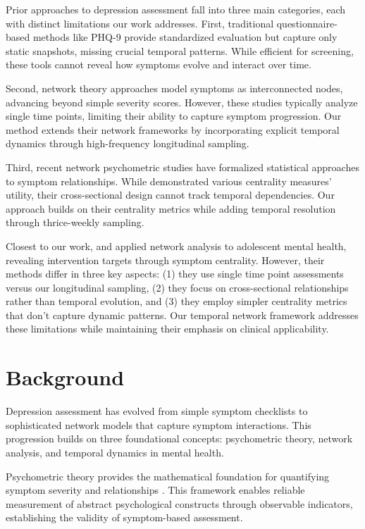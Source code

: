 \documentclass{article} %
\begin{document}
Prior approaches to depression assessment fall into three main categories, each with distinct limitations our work addresses. First, traditional questionnaire-based methods like PHQ-9 \citep{Kroenke2001ThePV} provide standardized evaluation but capture only static snapshots, missing crucial temporal patterns. While efficient for screening, these tools cannot reveal how symptoms evolve and interact over time.

Second, network theory approaches \citep{Fried2016MentalDA, Robinaugh2019TheNA} model symptoms as interconnected nodes, advancing beyond simple severity scores. However, these studies typically analyze single time points, limiting their ability to capture symptom progression. Our method extends their network frameworks by incorporating explicit temporal dynamics through high-frequency longitudinal sampling.

Third, recent network psychometric studies \citep{Marsman2018AnIT} have formalized statistical approaches to symptom relationships. While \citet{Contreras2019TheSO} demonstrated various centrality measures' utility, their cross-sectional design cannot track temporal dependencies. Our approach builds on their centrality metrics while adding temporal resolution through thrice-weekly sampling.

Closest to our work, \citet{Ruan2022ANA} and \citet{Pereira-Morales2019NetworkAO} applied network analysis to adolescent mental health, revealing intervention targets through symptom centrality. However, their methods differ in three key aspects: (1) they use single time point assessments versus our longitudinal sampling, (2) they focus on cross-sectional relationships rather than temporal evolution, and (3) they employ simpler centrality metrics that don't capture dynamic patterns. Our temporal network framework addresses these limitations while maintaining their emphasis on clinical applicability.

\section{Background}
\label{sec:background}

Depression assessment has evolved from simple symptom checklists to sophisticated network models that capture symptom interactions. This progression builds on three foundational concepts: psychometric theory, network analysis, and temporal dynamics in mental health.

Psychometric theory provides the mathematical foundation for quantifying symptom severity and relationships \citep{Marsman2018AnIT}. This framework enables reliable measurement of abstract psychological constructs through observable indicators, establishing the validity of symptom-based assessment.
\end{document}
